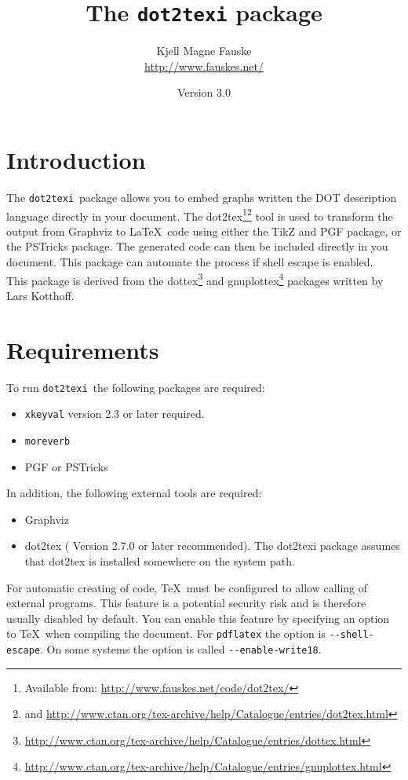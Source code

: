 \documentclass[a4paper]{ltxdoc}
\title{The \texttt{dot2texi} package}
\author{Kjell Magne Fauske\\\footnotesize{\url{http://www.fauskes.net/}}}
\date{Version 3.0}
\newcommand\packagename{\texttt{dot2texi}}
\begin{document}
\maketitle

\section{Introduction}

The \packagename\ package allows you to embed graphs written the DOT description language directly in your document. The dot2tex\footnote{Available from: \url{http://www.fauskes.net/code/dot2tex/}}\footnote{and \url{http://www.ctan.org/tex-archive/help/Catalogue/entries/dot2tex.html}} tool is used to transform the output from Graphviz to \LaTeX\ code using either the TikZ and PGF package, or the PSTricks package. The generated code can then be included directly in you document. This package can automate the process if shell escape is enabled.
\\

\noindent
This package is derived from the dottex\footnote{\url{http://www.ctan.org/tex-archive/help/Catalogue/entries/dottex.html}} and gnuplottex\footnote{\url{http://www.ctan.org/tex-archive/help/Catalogue/entries/gnuplottex.html}} packages written by Lars Kotthoff.

\section{Requirements}

To run \packagename\ the following packages are required:
\begin{itemize}
    \item \texttt{xkeyval} version 2.3 or later required.
    \item \texttt{moreverb}
    \item PGF or PSTricks
\end{itemize}
In addition, the following external tools are required:
\begin{itemize}
    \item Graphviz
    \item dot2tex ( Version 2.7.0 or later recommended). The dot2texi package assumes that dot2tex is installed somewhere on the system path.
\end{itemize}


\noindent
For automatic creating of code, \TeX\ must be configured to allow calling of external programs. This feature is a potential security risk and is therefore usually disabled by default. You can enable this feature by specifying an option to \TeX\ when compiling the document. For \texttt{pdflatex} the option is \verb|--shell-escape|. On some systems the option is called \verb|--enable-write18|.
\end{document}
